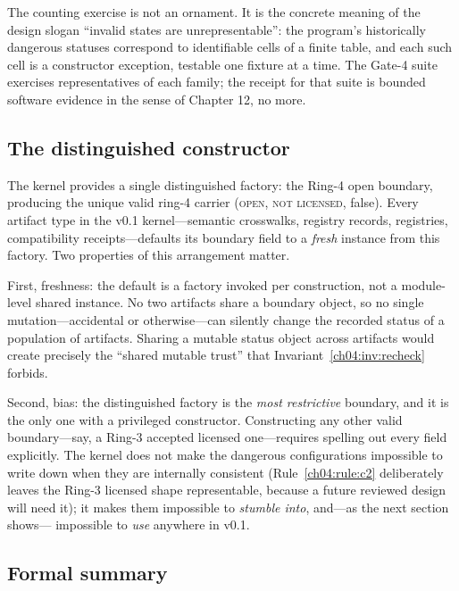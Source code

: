 The counting exercise is not an ornament. It is the concrete meaning of the
design slogan ``invalid states are unrepresentable'': the program's
historically dangerous statuses correspond to identifiable cells of a finite
table, and each such cell is a constructor exception, testable one fixture at
a time. The Gate-4 suite exercises representatives of each family; the
receipt for that suite is bounded software evidence in the sense of
Chapter 12, no more.

\subsection{The distinguished constructor}

The kernel provides a single distinguished factory: the Ring-4 open boundary,
producing the unique valid ring-4 carrier
(\textsc{open}, \textsc{not licensed}, false). Every artifact type in the
v0.1 kernel---semantic crosswalks, registry records, registries,
compatibility receipts---defaults its boundary field to a \emph{fresh}
instance from this factory. Two properties of this arrangement matter.

First, freshness: the default is a factory invoked per construction, not a
module-level shared instance. No two artifacts share a boundary object, so no
single mutation---accidental or otherwise---can silently change the recorded
status of a population of artifacts. Sharing a mutable status object across
artifacts would create precisely the ``shared mutable trust'' that
Invariant~\ref{ch04:inv:recheck} forbids.

Second, bias: the distinguished factory is the \emph{most restrictive}
boundary, and it is the only one with a privileged constructor. Constructing
any other valid boundary---say, a Ring-3 accepted licensed one---requires
spelling out every field explicitly. The kernel does not make the dangerous
configurations impossible to write down when they are internally consistent
(Rule~\ref{ch04:rule:c2} deliberately leaves the Ring-3 licensed shape
representable, because a future reviewed design will need it); it makes them
impossible to \emph{stumble into}, and---as the next section shows---
impossible to \emph{use} anywhere in v0.1.

\subsection{Formal summary}

